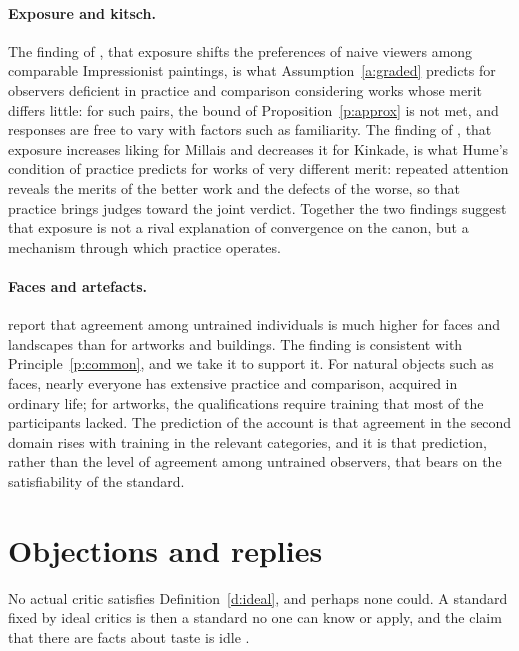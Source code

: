 \documentclass{situationist-preprint}
\begin{document}
\paragraph{Exposure and kitsch.} The finding of \citet{Cutting2003}, that exposure shifts the preferences of naive viewers among comparable Impressionist paintings, is what Assumption~\ref{a:graded} predicts for observers deficient in practice and comparison considering works whose merit differs little: for such pairs, the bound of Proposition~\ref{p:approx} is not met, and responses are free to vary with factors such as familiarity. The finding of \citet{Meskin2013}, that exposure increases liking for Millais and decreases it for Kinkade, is what Hume's condition of practice predicts for works of very different merit: repeated attention reveals the merits of the better work and the defects of the worse, so that practice brings judges toward the joint verdict. Together the two findings suggest that exposure is not a rival explanation of convergence on the canon, but a mechanism through which practice operates.

\paragraph{Faces and artefacts.} \citet{Vessel2018} report that agreement among untrained individuals is much higher for faces and landscapes than for artworks and buildings. The finding is consistent with Principle~\ref{p:common}, and we take it to support it. For natural objects such as faces, nearly everyone has extensive practice and comparison, acquired in ordinary life; for artworks, the qualifications require training that most of the participants lacked. The prediction of the account is that agreement in the second domain rises with training in the relevant categories, and it is that prediction, rather than the level of agreement among untrained observers, that bears on the satisfiability of the standard.

\section{Objections and replies}\label{s:obj}

\begin{objection}[Idealization]\label{o:ideal}
No actual critic satisfies Definition~\ref{d:ideal}, and perhaps none could. A standard fixed by ideal critics is then a standard no one can know or apply, and the claim that there are facts about taste is idle \citep{Ross2008}.
\end{objection}
\end{document}
